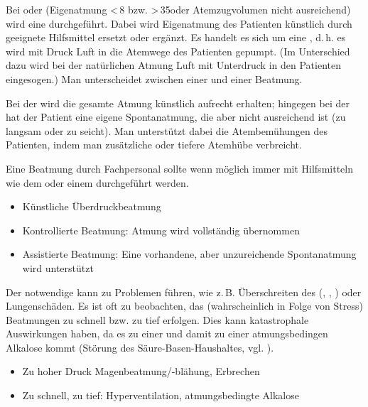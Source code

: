 {Bei  oder  (Eigenatmung \textless\,8 bzw.
\textgreater\,35\PerMin* oder Atemzugvolumen nicht
ausreichend) wird eine 
durchgeführt.
Dabei wird Eigenatmung des Patienten künstlich durch geeignete Hilfsmittel ersetzt oder ergänzt.
Es handelt es sich um eine
,
d.\,h. es wird mit Druck Luft in die Atemwege des Patienten
gepumpt. (Im Unterschied dazu wird bei der natürlichen
Atmung Luft mit Unterdruck in den Patienten eingesogen.) Man
unterscheidet zwischen einer  und einer
 Beatmung.

Bei der 
wird die gesamte Atmung künstlich aufrecht erhalten;
hingegen bei der  hat der Patient eine eigene Spontanatmung, die
aber nicht ausreichend ist (zu langsam oder zu seicht). Man
unterstützt dabei die Atembemühungen des Patienten, indem
man zusätzliche oder tiefere Atemhübe verbreicht.

Eine Beatmung durch Fachpersonal sollte wenn möglich immer
mit Hilfsmitteln wie dem  oder einem
 durchgeführt werden.
}{
\begin{itemize}
  \item Künstliche Überdruckbeatmung
  \item Kontrollierte Beatmung: Atmung wird vollständig
  übernommen
  \item Assistierte Beatmung: Eine vorhandene, aber
  unzureichende Spontanatmung wird unterstützt
\end{itemize}
}{}{}{}

{Der notwendige  kann zu Problemen führen, wie
z.\,B. Überschreiten des 
(, , ) oder
Lungenschäden.
Es ist oft zu beobachten, das (wahrscheinlich in Folge von
Stress) Beatmungen zu schnell bzw. zu tief erfolgen. Dies
kann katastrophale Auswirkungen haben, da es zu einer
 und damit zu einer atmungsbedingen
Alkalose kommt (Störung des Säure-Basen-Haushaltes, vgl.
).


}{
\begin{itemize}
  \item Zu hoher Druck  Magenbeatmung/-blähung,
  Erbrechen
  \item Zu schnell, zu tief: Hyperventilation,
  atmungsbedingte Alkalose
\end{itemize}
}{}{}{}

